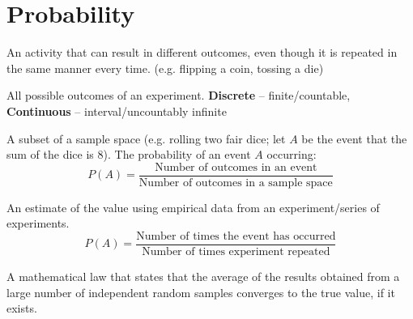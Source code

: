 \documentclass[]{article}
\newenvironment{definitions}{
	\begin{description}[font=\sffamily\bfseries, leftmargin=1cm, style=nextline]
	}{
	\end{description}
}
\begin{document}
\section{Probability}
\begin{definitions}
	\item[Experiment]
	An activity that can result in different outcomes, even though it is repeated in the same manner every time. (e.g. flipping a coin, tossing a die)
	\item[Sample Space]
	All possible outcomes of an experiment. \textbf{Discrete} -- finite/countable, \textbf{Continuous} -- interval/uncountably infinite
	\item[Event]
	A subset of a sample space (e.g. rolling two fair dice; let $A$ be the event that the sum of the dice is 8). The probability of an event $A$ occurring:
	\[P(A) = \frac{\text{Number of outcomes in an event}}{\text{Number of outcomes in a sample space}}\]
	\item[Empirical Probability]
	An estimate of the value using empirical data from an experiment/series of experiments.
	\[P(A) = \frac{\text{Number of times the event has occurred}}{\text{Number of times experiment repeated}}\]
	\item[Law of Large Numbers]
	A mathematical law that states that the average of the results obtained from a large number of independent random samples converges to the true value, if it exists.
\end{definitions}
\end{document}
